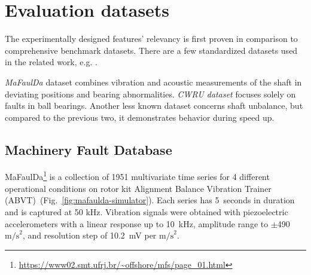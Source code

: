 \section{Evaluation datasets} \label{section:evaluation-datasets}
The experimentally designed features' relevancy is first proven in comparison to comprehensive benchmark datasets. There are a few standardized datasets used in the related work, e.g. \cite{ribeiro_rotating_2017}.

\emph{MaFaulDa} dataset combines vibration and acoustic measurements of the shaft in deviating positions and bearing abnormalities. \emph{CWRU dataset} focuses solely on faults in ball bearings. Another less known dataset concerns shaft unbalance, but compared to the previous two, it demonstrates behavior during speed up.  

\subsection{Machinery Fault Database}
MaFaulDa\footnote{\url{https://www02.smt.ufrj.br/~offshore/mfs/page_01.html}} is a collection of 1951 multivariate time series for 4 different operational conditions on rotor kit Alignment Balance Vibration Trainer (ABVT)~(Fig.~\ref{fig:mafaulda-simulator}). Each series has 5~seconds in duration and is captured at 50 kHz. Vibration signals were obtained with piezoelectric accelerometers with a linear response up to 10~kHz, amplitude range to $\pm$490 $\mathrm{m/s}^2$, and resolution step of 10.2~mV per $\mathrm{m/s}^2$. 

